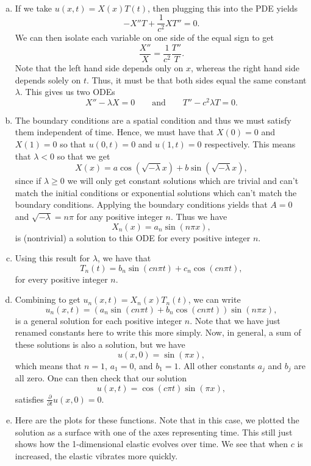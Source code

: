 \documentclass[12pt]{article} %
\begin{document}
\begin{solution}~
\begin{enumerate}[(a)]
    \item If we take $u(x,t)=X(x)T(t)$, then plugging this into the PDE yields
    \[
    -X''T+\frac{1}{c^2} XT'' = 0.
    \]
    We can then isolate each variable on one side of the equal sign to get
    \[
    \frac{X''}{X} = \frac{1}{c^2}\frac{T''}{T}.
    \]
    Note that the left hand side depends only on $x$, whereas the right hand side depends solely on $t$. Thus, it must be that both sides equal the same constant $\lambda$. This gives us two ODEs
    \[
    X'' -\lambda X = 0 \qquad \textrm{and} \qquad T'' -c^2 \lambda T = 0.
    \]
    
    \item The boundary conditions are a spatial condition and thus we must satisfy them independent of time.  Hence, we must have that $X(0)=0$ and $X(1)=0$ so that $u(0,t)=0$ and $u(1,t)=0$ respectively.  This means that $\lambda<0$ so that we get
    \[
    X(x) = a\cos(\sqrt{-\lambda}x) +b \sin(\sqrt{-\lambda} x),
    \]
    since if $\lambda \geq 0$ we will only get constant solutions which are trivial and can't match the initial conditions or exponential solutions which can't match the boundary conditions.  Applying the boundary conditions yields that $A=0$ and $\sqrt{-\lambda}=n\pi$ for any positive integer $n$. Thus we have
    \[
    X_n(x) = a_n \sin(n\pi x), 
    \]
    is (nontrivial) a solution to this ODE for every positive integer $n$.
    
    \item Using this result for $\lambda$, we have that
    \[
    T_n(t) = b_n \sin(cn\pi t)+c_n \cos(cn\pi t),
    \]
    for every positive integer $n$.  
    
    \item Combining to get $u_n(x,t) =X_n(x)T_n(t)$, we can write
    \[
    u_n(x,t) = \left(a_n \sin(cn\pi t)+b_n \cos(cn\pi t)\right) \sin(n\pi x),
    \]
    is a general solution for each positive integer $n$.  Note that we have just renamed constants here to write this more simply.  Now, in general, a sum of these solutions is also a solution, but we have
    \[
    u(x,0)=\sin(\pi x),
    \]
    which means that $n=1$, $a_1=0$, and $b_1=1$.  All other constants $a_j$ and $b_j$ are all zero.  One can then check that our solution
    \[
    u(x,t) = \cos(c \pi t) \sin(\pi x),
    \]
    satisfies $\frac{\partial}{\partial t} u(x,0) = 0$.  
    
    \item Here are the plots for these functions. Note that in this case, we plotted the solution as a surface with one of the axes representing time.  This still just shows how the 1-dimensional elastic evolves over time. We see that when $c$ is increased, the elastic vibrates more quickly.
    

\end{enumerate}
\end{solution}
\end{document}
